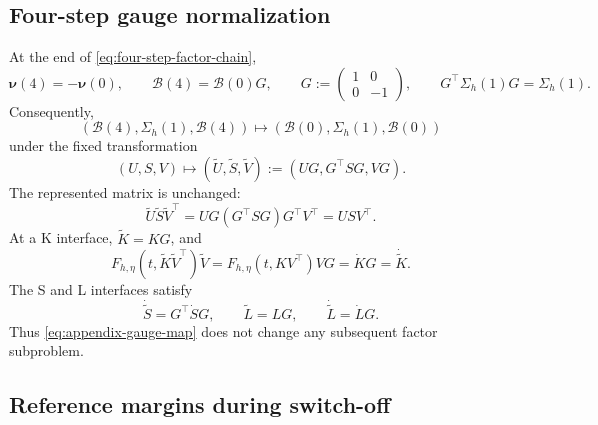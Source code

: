 \documentclass[]{article}
\numberwithin{equation}{section}
\theoremstyle{plain}
\theoremstyle{remark}
\begin{document}
\subsection{Four-step gauge normalization}
\label{app:four-step-gauge}

At the end of \eqref{eq:four-step-factor-chain},
\begin{equation}\label{eq:appendix-gauge-data}
 \boldsymbol\nu(4)=-\boldsymbol\nu(0),
 \qquad \mathcal B(4)=\mathcal B(0)G,
 \qquad G:=\begin{pmatrix}1&0\\0&-1\end{pmatrix},
 \qquad G^\top \Sigma_h(1)G=\Sigma_h(1).
\end{equation}
Consequently,
\begin{equation}\label{eq:appendix-gauge-cycle}
 (\mathcal B(4),\Sigma_h(1),\mathcal B(4))
 \longmapsto
 (\mathcal B(0),\Sigma_h(1),\mathcal B(0))
\end{equation}
under the fixed transformation
\begin{equation}\label{eq:appendix-gauge-map}
 (U,S,V)\longmapsto
 (\widetilde U,\widetilde S,\widetilde V)
 :=(UG,G^\top SG,VG).
\end{equation}
The represented matrix is unchanged:
\[
 \widetilde U\widetilde S\widetilde V^\top
 =UG(G^\top SG)G^\top V^\top=USV^\top.
\]
At a K interface, \(\widetilde K=KG\), and
\[
 F_{h,\eta}(t,\widetilde K\widetilde V^\top)\widetilde V
 =F_{h,\eta}(t,KV^\top)VG
 =\dot K G=\dot{\widetilde K}.
\]
The S and L interfaces satisfy
\[
 \dot{\widetilde S}=G^\top\dot S G,
 \qquad
 \widetilde L=LG,
 \qquad
 \dot{\widetilde L}=\dot L G.
\]
Thus \eqref{eq:appendix-gauge-map} does not change any subsequent
factor subproblem.

\subsection{Reference margins during switch-off}
\label{app:switch-off-margins}
\end{document}
